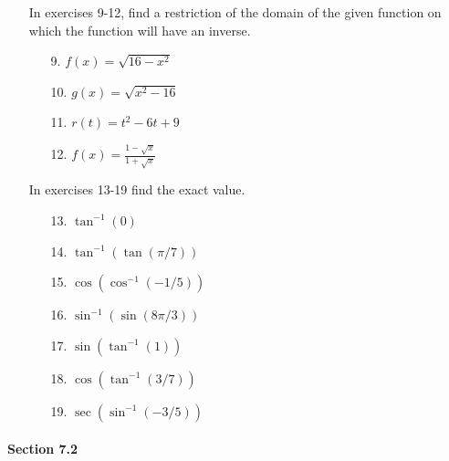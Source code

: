 \documentclass[12pt]{report}
\begin{document}
\begin{itemize}
\begin{itemize}
\item[] In exercises 9-12, find a restriction of the domain of the given function on which the function will have an inverse.
\begin{itemize}
\item[9.] $f(x)=\sqrt{16-x^2}$
\item[10.] $g(x)=\sqrt{x^2-16}$
\item[11.] $r(t)=t^2-6t+9$
\item[12.] $f(x)=\frac{1-\sqrt x}{1+\sqrt x}$
\end{itemize}
\item[] In exercises 13-19 find the exact value.
\begin{itemize}
\item[13.] $\tan^{-1}(0)$
\item[14.] $\tan^{-1}(\tan(\pi/7))$
\item[15.] $\cos(\cos^{-1}(-1/5))$
\item[16.] $\sin^{-1}(\sin(8\pi/3))$
\item[17.] $\sin(\tan^{-1}(1))$
\item[18.] $\cos(\tan^{-1}(3/7))$
\item[19.] $\sec(\sin^{-1}(-3/5))$
\end{itemize}
\end{itemize}

\end{itemize}

\paragraph{Section 7.2}
\end{document}
